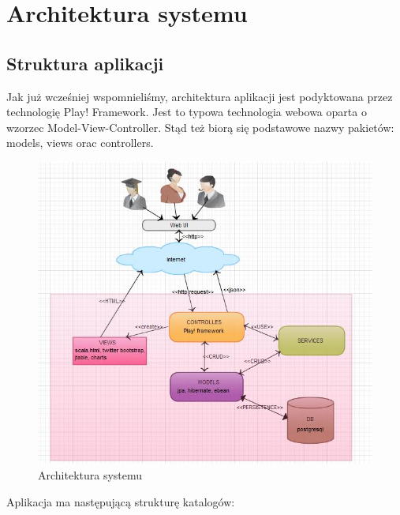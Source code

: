 \documentclass[a4paper,12pt,notitlepage]{mwrep}
\begin{document}
\chapter{Architektura systemu}

\section{Struktura aplikacji}
Jak już wcześniej wspomnieliśmy, architektura aplikacji jest podyktowana przez technologię Play! Framework. Jest to 
typowa technologia webowa oparta o wzorzec Model-View-Controller. Stąd też biorą się podstawowe nazwy pakietów: models, 
views orac controllers. \\
\begin{figure}[H]
\centering
\includegraphics[scale=1.0]{images/tasksArch.jpg}
\caption{Architektura systemu}
\label{fig:tasksArch}
\end{figure}

\newpage
Aplikacja ma następującą strukturę katalogów:
\end{document}
